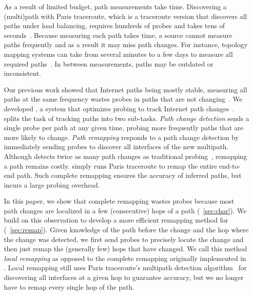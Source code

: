 As a result of limited budget, path measurements take time.  Discovering
a (multi)path with Paris traceroute, which is a traceroute version that
discovers all paths under load balancing, requires hundreds of probes
and takes tens of seconds~\cite{veitch09balancer}.\footnotemark{}
Because measuring each path takes time, a source cannot measure paths
frequently and as a result it may miss path changes. For instance,
topology mapping systems can take from several minutes to a few days to
measure all required paths~\cite{cunha11fastmapping, sherwood08discarte,
skitter}.  In between measurements, paths may be outdated or
inconsistent.



Our previous work showed that Internet paths being mostly stable,
measuring all paths at the same frequency wastes probes in paths that
are not changing~\cite{cunha11dtrack}. We developed \dtrack{}, a system
that optimizes probing to track Internet path
changes~\cite{cunha11dtrack}.  \dtrack{} splits the task of tracking
paths into two sub-tasks.  \textit{Path change detection} sends a single
probe per path at any given time, probing more frequently paths that are
more likely to change. \textit{Path remapping} responds to a path change detection
by immediately sending probes to discover all interfaces of the new multipath.
Although \dtrack{} detects twice as many path changes
as traditional probing~\cite{cunha11dtrack}, remapping a path remains
costly.  \dtrack{} simply runs Paris traceroute to remap the entire
end-to-end path. Such complete remapping ensures the accuracy of
inferred paths, but incurs a large probing overhead.

In this paper, we show that complete remapping wastes probes because
most path changes are localized in a few (consecutive) hops of a path
(\secstr~\ref{sec:char}). We build on this observation to develop a more
efficient remapping method for \dtrack{} (\secstr~\ref{sec:remap}).
Given knowledge of the path before the change and the hop where the
change was detected, we first send probes to precisely locate the change and then
just remap the (generally few) hops that have changed. We call this
method \textit{local remapping} as opposed to the complete remapping
originally implemented in \dtrack{}. Local remapping still uses Paris
traceroute's multipath detection algorithm~\cite{veitch09balancer} for
discovering all interfaces at a given hop to guarantee accuracy, but we
no longer have to remap every single hop of the path.

